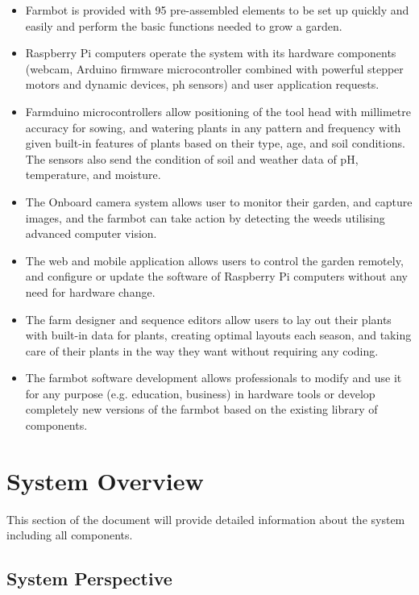 \begin{itemize}
    \item Farmbot is provided with 95 pre-assembled elements to be set up quickly and easily and perform the basic functions needed to grow a garden.
    \item Raspberry Pi computers operate the system with its hardware components (webcam, Arduino firmware microcontroller combined with powerful stepper motors and dynamic devices, ph sensors) and user application requests.
    \item Farmduino microcontrollers allow positioning of the tool head with millimetre accuracy for sowing, and watering plants in any pattern and frequency with given built-in features of plants based on their type, age, and soil conditions. The sensors also send the condition of soil and weather data of pH, temperature, and moisture.
    \item The Onboard camera system allows user to monitor their garden, and capture images, and the farmbot can take action by detecting the weeds utilising advanced computer vision.
    \item The web and mobile application allows users to control the garden remotely, and configure or update the software of Raspberry Pi computers without any need for hardware change.
    \item The farm designer and sequence editors allow users to lay out their plants with built-in data for plants, creating optimal layouts each season, and taking care of their plants in the way they want without requiring any coding.
    \item The farmbot software development allows professionals to modify and use it for any purpose (e.g. education, business) in hardware tools or develop completely new versions of the farmbot based on the existing library of components.
\end{itemize}

\section{System Overview}

This section of the document will provide detailed information about the system
including all components.

\subsection{System Perspective}

